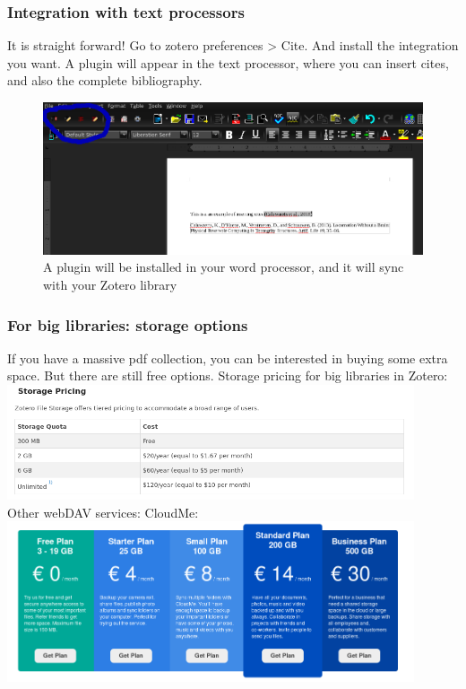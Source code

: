 \documentclass[a4paper]{article}
\begin{document}
\subsubsection{Integration with text processors}
\label{ssub:integration_with_text_processors}
It is straight forward! Go to zotero preferences > Cite. And install the integration you want. A plugin will appear in the text processor, where you can insert cites, and also the complete bibliography.
\begin{figure}[H]
    \centering
    \includegraphics[width=0.6\linewidth]{zotero_word.png}
    \caption{A plugin will be installed in your word processor, and it will sync with your Zotero library}
    \label{fig:zotero_word}
\end{figure}
\subsubsection{For big libraries: storage options}
\label{ssub:for_big_libraries_storage_options}

If you have a massive pdf collection, you can be interested in buying some extra space. But there are still free options. Storage pricing for big libraries in Zotero:\\
\includegraphics[width=0.9\textwidth]{zotero_price.png} \\

Other webDAV services: CloudMe:\\
\includegraphics[width=0.9\textwidth]{zotero_price_cloudme.png}\\
\end{document}
